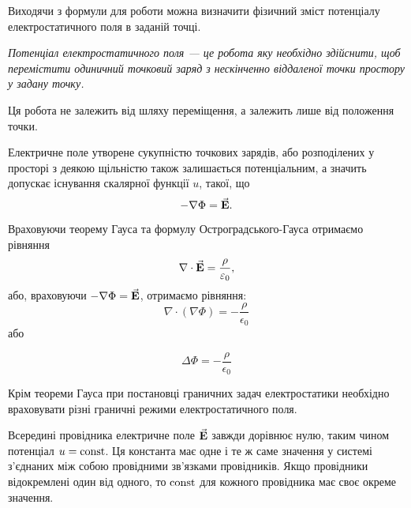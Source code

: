 Виходячи з формули для роботи можна визначити фізичний зміст потенціалу електростатичного поля в заданій точці. 

\begin{definition}
	\it{Потенціал електростатичного поля} --- це робота яку необхідно здійснити, щоб перемістити одиничний точковий заряд з нескінченно віддаленої точки простору у задану точку.
\end{definition}

\begin{remark}
	Ця робота не залежить від шляху переміщення, а залежить лише від положення точки.
\end{remark}
	 
Електричне поле утворене сукупністю точкових зарядів, або розподілених у просторі з деякою щільністю також залишається потенціальним, а значить допускає існування скалярної функції $u$, такої, що
\begin{equation}
	-\nabla \Phi = {\vec{\mathbf{E}}}.
\end{equation}

Враховуючи теорему Гауса та формулу Остроградського-Гауса отримаємо рівняння
\begin{equation}
	\nabla \cdot {\vec{\mathbf{E}}} = \frac{\rho}{\varepsilon_0},
\end{equation}
або, враховуючи $-\nabla \Phi = {\vec{\mathbf{E}}}$, отримаємо рівняння:
\begin{equation}
	\nabla \cdot (\nabla \Phi) = -\frac{\rho}{\epsilon_0}
\end{equation}
або
\begin{th_equation}
	\begin{equation}
		\Delta \Phi = - \frac{\rho}{\epsilon_0}
	\end{equation}
\end{th_equation}

\begin{remark}
	Крім теореми Гауса при постановці граничних задач електростатики необхідно враховувати різні граничні режими електростатичного поля.
\end{remark}

\begin{example}
	Всередині провідника електричне поле ${\vec{\mathbf{E}}}$ завжди дорівнює нулю, таким чином потенціал $u = \operatorname{const}$. Ця константа має одне і те ж саме значення у системі з'єднаних між собою провідними зв'язками провідників. Якщо провідники відокремлені один від одного, то $\operatorname{const}$ для кожного провідника має своє окреме значення.
\end{example}